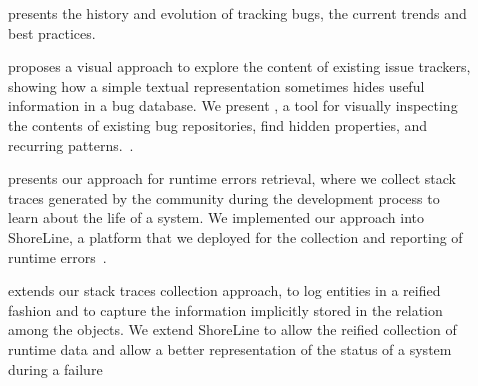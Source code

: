 \begin{description}
  \item[] presents the history and evolution of tracking bugs, the current trends and best practices.

  \item[] proposes a visual approach to explore the content of existing issue trackers, showing how a simple textual representation sometimes hides useful information in a bug database.
  We present \ib, a tool for visually inspecting the contents of existing bug repositories, find hidden properties, and recurring patterns.~\cite{DalS2013a,DalS2014a,DalS2014b}.






  \item[] presents our approach for runtime errors retrieval, where we collect stack traces generated by the community during the development process to learn about the life of a system.
  We implemented our approach into ShoreLine, a platform that we deployed for the collection and reporting of runtime errors~\cite{DalS2015a}.



  \item[] extends our stack traces collection approach, to log entities in a reified fashion and to capture the information implicitly stored in the relation among the objects.
  We extend ShoreLine to allow the reified collection of runtime data and allow a better representation of the status of a system during a failure~\cite{DalS2017b}


\end{description}
